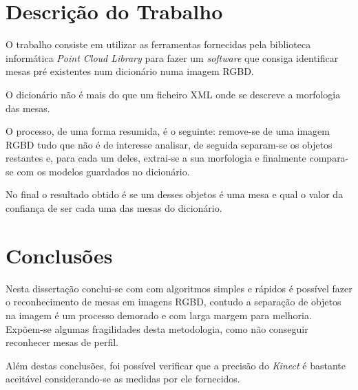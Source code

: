 \documentclass[9pt,a4paper]{extarticle}
\begin{document}
\begin{multicols}{2}
\section{Descrição do Trabalho}\label{sec:work}

O trabalho consiste em utilizar as ferramentas fornecidas pela biblioteca informática \emph{Point Cloud Library} para fazer um \emph{software} que consiga identificar mesas pré existentes num dicionário numa imagem RGBD.

O dicionário não é mais do que um ficheiro XML onde se descreve a morfologia das mesas.

O processo, de uma forma resumida, é o seguinte: remove-se de uma imagem RGBD tudo que não é de interesse analisar, de seguida separam-se os objetos restantes e, para cada um deles, extrai-se a sua morfologia e finalmente compara-se com os modelos guardados no dicionário.

No final o resultado obtido é se um desses objetos é uma mesa e qual o valor da confiança de ser cada uma das mesas do dicionário.


\section{Conclusões}\label{sec:conclui}

Nesta dissertação conclui-se com com algoritmos simples e rápidos é possível fazer o reconhecimento de mesas em imagens RGBD, contudo a separação de objetos na imagem é um processo demorado e com larga margem para melhoria. Expõem-se algumas fragilidades desta metodologia,  como não conseguir reconhecer mesas de perfil.

Além destas conclusões, foi possível verificar que a precisão do \emph{Kinect} é bastante aceitável considerando-se as medidas por ele fornecidos.

%

\end{multicols}
\end{document}

